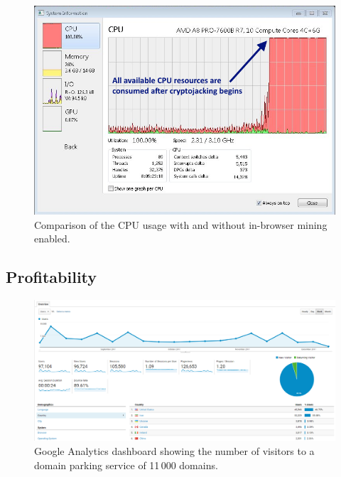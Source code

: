 \begin{figure}[t]
\centering
\includegraphics[width=\linewidth]{figures/windows_cpu_usage.png}
	\caption[Cryptojacking CPU Usage]{Comparison of the CPU usage with and without in-browser mining enabled.}\label{fig:cpu}
\end{figure}


\subsection{Profitability}
\label{profitabilitexperiment}

\begin{figure}[t]
\centering
\includegraphics[width=\linewidth]{figures/experiment_analytics_results.png}
\caption[Google Analytics Dashboard]{Google Analytics dashboard showing the number of visitors to a domain parking service of 11\,000 domains.}\label{fig:domain2}
\end{figure}


